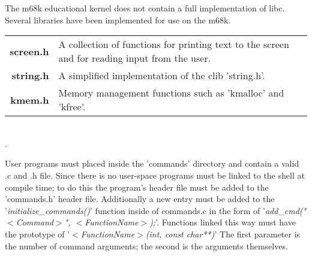 \documentclass{article}
\begin{document}

The m68k educational kernel does not contain a full implementation of libc. Several libraries have been implemented for use on the m68k.\\

\begin{tabulary}{\textwidth}{r L}
\bf{screen.h} & A collection of functions for printing text to the screen and for reading input from the user.\\
\bf{string.h} & A simplified implementation of the clib 'string.h'.\\
\bf{kmem.h} & Memory management functions such as 'kmalloc' and 'kfree'.\\
\end{tabulary}\\
{\tiny.}\\


User programs must placed inside the 'commands' directory and contain a valid .c and .h file. Since there is no user-space programs must be linked to the shell at compile time; to do this the program's header file must be added to the 'commands.h' header file. Additionally a new entry must be added to the '\emph{initialize\_commands()}' function inside of commands.c in the form of '\emph{add\_cmd("$<$Command$>$",  $<$FunctionName$>$);}'. Functions linked this way must have the prototype of '\emph{$<$FunctionName$>$(int, const char**)}' The first parameter is the number of command arguments; the second is the arguments themselves.\\
\end{document}
